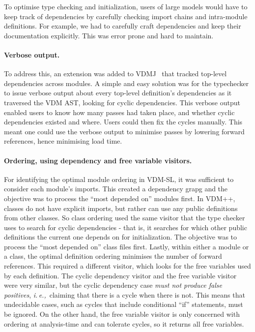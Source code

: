 \documentclass[runningheads,a4paper]{llncs}
\newcommand{\ie}{{\em i.\,e.,\/}}
\begin{document}
To optimise type checking and initialization, users of large models would have to keep track of dependencies by carefully checking import chains and intra-module definitions. For example, we had to carefully craft dependencies and keep their documentation explicitly. This was error prone and hard to maintain. 

\paragraph*{Verbose output.}
%
To address this, an extension was added to VDMJ~\cite{Battle09} that tracked top-level dependencies across modules. A simple and easy solution was for the typechecker to issue verbose output about every top-level definition's dependencies as it traversed the VDM AST, looking for cyclic dependencies. This verbose output enabled users to know how many passes had taken place, and whether cyclic dependencies existed and where. Users could then fix the cycles manually. This meant one could use the verbose output to minimise passes by lowering forward references, hence minimising load time.   

\paragraph*{Ordering, using dependency and free variable visitors.}
%
For identifying the optimal module ordering in VDM-SL, it was sufficient to consider each module's imports. This created a dependency grapg and the objective was to process the ``most depended on'' modules first. In VDM++, classes do not have explicit imports, but rather can use any public definitions from other classes. So class ordering used the same visitor that the type checker uses to search for cyclic dependencies - that is, it searches for which other public definitions the current one depends on for initialization. The objective was to process the ``most depended on'' class files first. Lastly, within either a module or a class, the optimal definition ordering minimises the number of forward references. This required a different visitor, which looks for the free variables used by each definition. The cyclic dependency visitor and the free variable visitor were very similar, but the cyclic dependency case \emph{must not produce false positives}, \ie~claiming that there is a cycle when there is not. This means that undecidable cases, such as cycles that include conditional ``if'' statements, must be ignored. On the other hand, the free variable visitor is only concerned with ordering at analysis-time and can tolerate cycles, so it returns all free variables.
\end{document}
